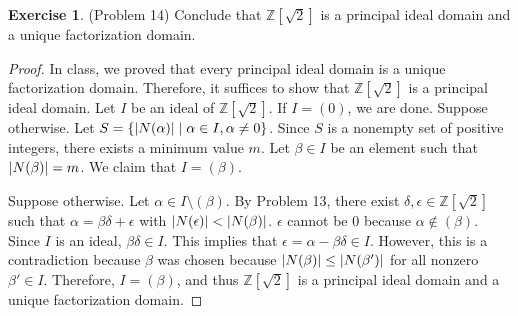 \documentclass[12pt, psamsfonts]{amsart}
\theoremstyle{definition}
\newtheorem*{exer}{Exercise}
\theoremstyle{remark}
\numberwithin{equation}{section}
\begin{document}
\begin{exer}{(Problem 14)}
  Conclude that $\mathbb{Z}[\sqrt{2}]$ is a principal ideal domain and a unique factorization domain.
\end{exer}

\begin{proof}
  In class, we proved that every principal ideal domain is a unique factorization domain.
  Therefore, it suffices to show that $\mathbb{Z}[\sqrt{2}]$ is a principal ideal domain.
  Let $I$ be an ideal of $\mathbb{Z}[\sqrt{2}]$.
  If $I = (0)$, we are done.
  Suppose otherwise.
  Let $S = \{ \abs{N(\alpha)} \mid \alpha \in I, \alpha \ne 0 \}$.
  Since $S$ is a nonempty set of positive integers, there exists a minimum value $m$.
  Let $\beta \in I$ be an element such that $\abs{N(\beta)} = m$.
  We claim that $I = (\beta)$.

  Suppose otherwise.
  Let $\alpha \in I \setminus (\beta)$.
  By Problem 13, there exist $\delta, \epsilon \in \mathbb{Z}[\sqrt{2}]$ such that $\alpha = \beta\delta + \epsilon$ with $\abs{N(\epsilon)} < \abs{N(\beta)}$.
  $\epsilon$ cannot be $0$ because $\alpha \notin (\beta)$.
  Since $I$ is an ideal, $\beta\delta \in I$.
  This implies that $\epsilon = \alpha - \beta\delta \in I$.
  However, this is a contradiction because $\beta$ was chosen because $\abs{N(\beta)} \leq \abs{N(\beta')}$ for all nonzero $\beta' \in I$.
  Therefore, $I = (\beta)$, and thus $\mathbb{Z}[\sqrt{2}]$ is a principal ideal domain and a unique factorization domain.
\end{proof}
\end{document}
